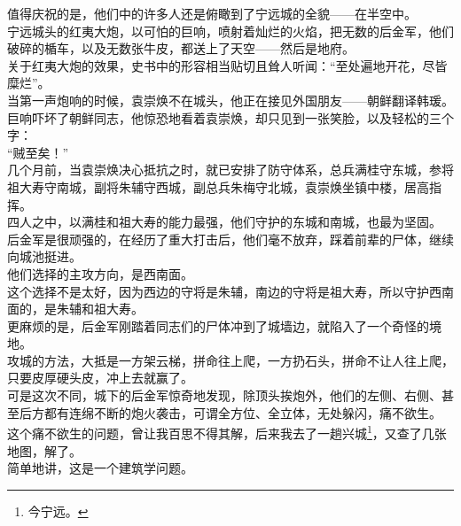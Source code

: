 \begin{multicols}{\theparacolNo}
值得庆祝的是，他们中的许多人还是俯瞰到了宁远城的全貌——在半空中。\\

宁远城头的红夷大炮，以可怕的巨响，喷射着灿烂的火焰，把无数的后金军，他们破碎的楯车，以及无数张牛皮，都送上了天空——然后是地府。\\

关于红夷大炮的效果，史书中的形容相当贴切且耸人听闻：“至处遍地开花，尽皆糜烂”。\\

当第一声炮响的时候，袁崇焕不在城头，他正在接见外国朋友——朝鲜翻译韩瑗。\\

巨响吓坏了朝鲜同志，他惊恐地看着袁崇焕，却只见到一张笑脸，以及轻松的三个字：\\

“贼至矣！”\\

几个月前，当袁崇焕决心抵抗之时，就已安排了防守体系，总兵满桂守东城，参将祖大寿守南城，副将朱辅守西城，副总兵朱梅守北城，袁崇焕坐镇中楼，居高指挥。\\

四人之中，以满桂和祖大寿的能力最强，他们守护的东城和南城，也最为坚固。\\

后金军是很顽强的，在经历了重大打击后，他们毫不放弃，踩着前辈的尸体，继续向城池挺进。\\

他们选择的主攻方向，是西南面。\\

这个选择不是太好，因为西边的守将是朱辅，南边的守将是祖大寿，所以守护西南面的，是朱辅和祖大寿。\\

更麻烦的是，后金军刚踏着同志们的尸体冲到了城墙边，就陷入了一个奇怪的境地。\\

攻城的方法，大抵是一方架云梯，拼命往上爬，一方扔石头，拼命不让人往上爬，只要皮厚硬头皮，冲上去就赢了。\\

可是这次不同，城下的后金军惊奇地发现，除顶头挨炮外，他们的左侧、右侧、甚至后方都有连绵不断的炮火袭击，可谓全方位、全立体，无处躲闪，痛不欲生。\\

这个痛不欲生的问题，曾让我百思不得其解，后来我去了一趟兴城\footnote{今宁远。}，又查了几张地图，解了。\\

简单地讲，这是一个建筑学问题。\\


\end{multicols}
